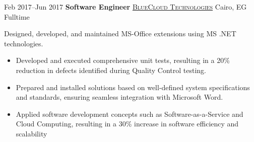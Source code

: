 \documentclass{subfiles}
\begin{document}

\cventry
    {Feb 2017--Jun 2017}
    {\textbf{Software Engineer}}
    {\textsc{\href{https://www.bluecloudcorp.com/}{BlueCloud Technologies}}}
    {Cairo, EG}
    {Fulltime}
    {
Designed, developed, and maintained MS-Office extensions using MS .NET technologies.
\begin{itemize}
  \item Developed and executed comprehensive unit tests, resulting in a 20\% reduction in defects identified during Quality Control testing.
  \item Prepared and installed solutions based on well-defined system specifications and standards, ensuring seamless integration with Microsoft Word.
  \item Applied software development concepts such as Software-as-a-Service and Cloud Computing, resulting in a 30\% increase in software efficiency and scalability
\end{itemize}
}
\end{document}
